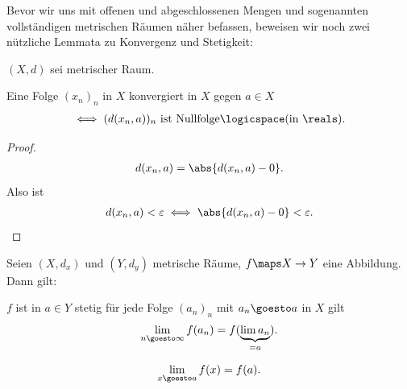 Bevor wir uns mit offenen und abgeschlossenen Mengen und sogenannten vollständigen metrischen Räumen näher befassen, beweisen wir noch zwei nützliche Lemmata zu Konvergenz und Stetigkeit:

\begin{lemma}\label{konvergenz_abstand_ist_nullfolge}
    \( (X,d) \) sei metrischer Raum.

    Eine Folge \( (x_n)_n \) in \( X \) konvergiert in \( X \) gegen \( a\in X \)
    \begin{align*}
        \iff (d(x_n,a))_n \text{ ist Nullfolge}\logicspace(\text{in } \reals).
    \end{align*}
\end{lemma}
\begin{proof}
    \begin{align*}
        d(x_n,a)=\abs{d(x_n,a)-0}.
    \end{align*}
    Also ist
    \begin{align*}
        d(x_n,a)<\varepsilon\iff \abs{d(x_n,a)-0}<\varepsilon.
    \end{align*}
    
\end{proof}
\begin{lemma}\label{stetigkeit:folgenkonvergenzkriterium}
    Seien \( (X,d_x) \) und \( (Y, d_y) \) metrische Räume, \( f\maps X\to Y \) eine Abbildung. 
    Dann gilt:

    \( f \) ist in \( a\in Y \) stetig \tiff für jede Folge \( (a_n)_n \) mit \( a_n\goesto a \) in \( X \) gilt
    \begin{align*}
        \lim\limits_{n \goesto \infty}  f(a_n)=f(\underbrace{\lim a_n}_{=a}).
    \end{align*} 
    \begin{notation*}
        \begin{align*}
            \lim\limits_{x \goesto a} f(x)=f(a).
        \end{align*}
    \end{notation*}
    
\end{lemma}
